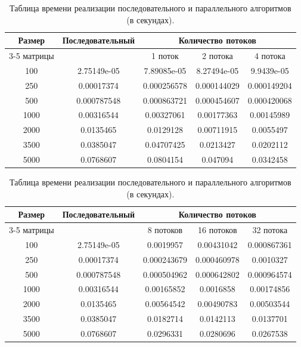 \begin{table}[ht!]
	\centering
	\captionsetup{singlelinecheck = false, justification=raggedright}
	\caption{Таблица времени реализации последовательного и параллельного алгоритмов (в секундах).}
	\label{table:4_1}
	\begin{tabular}{|c|c|c|c|c|}
		\hline
		\multirow{2}{*}{Размер}& \multirow{2}{*}{Последовательный} & \multicolumn{3}{c|}{Количество потоков} \\ \cline{3-5}
		матрицы& &1 поток & 2 потока &4 потока \\ \hline
		100 & 2.75149e-05 & 7.89085e-05 & 8.27494e-05 & 9.9439e-05 \\ \hline
		250 & 0.00017374  & 0.000256578 & 0.000144029 & 0.000149204 \\ \hline
		500 & 0.000787548 & 0.000863721 & 0.000454607 & 0.000420068 \\ \hline
		1000 & 0.00316544 & 0.00327061  & 0.00177363  & 0.00145989 \\ \hline
		2000 & 0.0135465  & 0.0129128   & 0.00711915  & 0.0055497 \\ \hline
		3500 & 0.0385047  & 0.04707425  & 0.0213427   & 0.0202112 \\ \hline
		5000 & 0.0768607  & 0.0804154   & 0.047094    & 0.0342458 \\\hline
	\end{tabular}
\end{table} 

\begin{table}[ht!]
	\centering
	\captionsetup{singlelinecheck = false, justification=raggedright}
	\caption{Таблица времени реализации последовательного и параллельного алгоритмов (в секундах).}
	\label{table:4_2}
	\begin{tabular}{|c|c|c|c|c|}
		\hline
		\multirow{2}{*}{Размер}& \multirow{2}{*}{Последовательный} & \multicolumn{3}{c|}{Количество потоков} \\ \cline{3-5}
		матрицы& &8 потоков & 16 потоков &32 потока \\ \hline
		100 & 2.75149e-05 & 0.0019957   & 0.00431042  & 0.000867361 \\ \hline
		250 & 0.00017374  & 0.000243679 & 0.000460978 & 0.0010327 \\ \hline
		500 & 0.000787548 & 0.000504962 & 0.000642802 & 0.000964574 \\ \hline
		1000 & 0.00316544 & 0.00165852  & 0.0016858   & 0.00174856 \\ \hline
		2000 & 0.0135465  & 0.00564542  & 0.00490783  & 0.00503544 \\ \hline
		3500 & 0.0385047  & 0.0182714   & 0.0142113   & 0.0137701 \\ \hline
		5000 & 0.0768607  & 0.0296331   & 0.0280696   & 0.0267538 \\\hline
	\end{tabular}
\end{table} 

